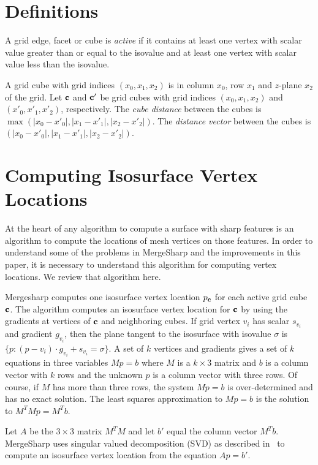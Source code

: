 
\section{Definitions}

A grid edge, facet or cube is {\em active} if it contains at least one vertex 
with scalar value greater than or equal to the isovalue
and at least one vertex with scalar value less than the isovalue.

A grid cube with grid indices $(x_0,x_1,x_2)$ is in column $x_0$, row $x_1$
and $z$-plane $x_2$ of the grid.
Let $\mathbf{c}$ and $\mathbf{c}'$ be grid cubes with grid indices $(x_0,x_1,x_2)$
and $(x'_0,x'_1,x'_2)$, respectively.
The {\em cube distance} between the cubes 
is $\max(|x_0-x'_0|, |x_1-x'_1|, |x_2-x'_2|)$.
The {\em distance vector} between the cubes is
$(|x_0-x'_0|, |x_1-x'_1|, |x_2-x'_2|)$.


\section{Computing Isosurface Vertex Locations}
\label{section:loc}

At the heart of any algorithm to compute a surface with sharp features 
is an algorithm to compute the locations of mesh vertices on those features.
In order to understand some of the problems in MergeSharp 
and the improvements in this paper,
it is necessary to understand this algorithm for computing vertex locations.
We review that algorithm here.

Mergesharp computes one isosurface vertex location $p_{\mathbf{c}}$
for each active grid cube $\mathbf{c}$.
The algorithm computes an isosurface vertex location for $\mathbf{c}$
by using the gradients at vertices of $\mathbf{c}$ and neighboring cubes.
If grid vertex $v_i$ has scalar $s_{v_i}$ and gradient $g_{v_i}$, 
then the plane tangent to the isosurface  with isovalue $\sigma$
is $\{p : (p-v_i) \cdot g_{v_i} + s_{v_i}= \sigma \}$.
A set of $k$ vertices and gradients gives a set of $k$ equations 
in three variables $M p = b$
where $M$ is a $k \times 3$ matrix 
and $b$ is a column vector with $k$ rows 
and the unknown $p$ is a column vector with three rows.
Of course, if $M$ has more than three rows,
the system $Mp = b$ is over-determined and has no exact solution.
The least squares approximation to $M p = b$ 
is the solution to $M^T M p = M^T b$.

Let $A$ be the $3 \times 3$ matrix $M^T M$ and 
let $b'$ equal the column vector $M^T b$.
MergeSharp uses singular valued decomposition (SVD)
as described in~\cite{jlsw-dchd-02,kbsh-fssev-01,l-oslpm-00}
to compute an isosurface vertex location from the equation $A p = b'$.

